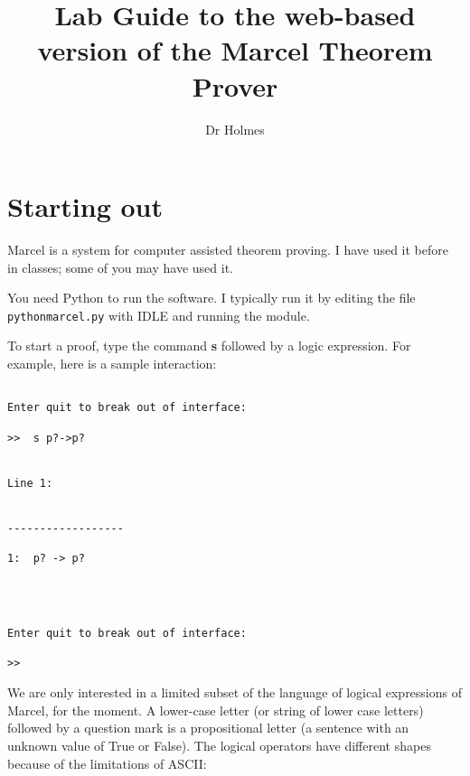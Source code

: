 \documentclass[12pt]{article}
\title{Lab Guide to the web-based version of the Marcel Theorem Prover}
\author{Dr Holmes}
\begin{document}
\maketitle

\tableofcontents

\section{Starting out}

Marcel is a system for computer assisted theorem proving.  I have used it before in classes; some of you may have used it.

You need Python to run the software.  I typically run it by editing the file {\tt pythonmarcel.py} with IDLE and running the module.

To start a proof, type the command {\bf s} followed by a logic expression.  For example, here is a sample interaction:

\begin{verbatim}

Enter quit to break out of interface:

>>  s p?->p?


Line 1:


------------------

1:  p? -> p?  




Enter quit to break out of interface:

>>  

\end{verbatim}

We are only interested in a limited subset of the language of logical expressions of Marcel, for the moment.  A lower-case letter (or string of lower case letters) followed by a question mark is a propositional letter (a sentence with an unknown value of True or False).  The logical operators have different shapes because
of the limitations of ASCII:  

\end{document}
